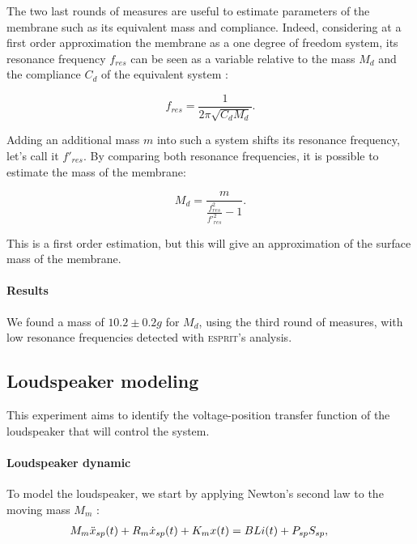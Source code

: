 \documentclass[11pt, twocolumn]{article}
\begin{document}
\vspace{5pt}

The two last rounds of measures are useful to estimate parameters of the membrane such as its equivalent mass and compliance. Indeed, considering at a first order approximation the membrane as a one degree of freedom system, its resonance frequency $f_{res}$ can be seen as a variable relative to the mass $M_d$ and the compliance $C_d$ of the equivalent system :

\begin{equation}
    f_{res} = \frac{1}{2\pi \sqrt{C_d M_d}}.
\end{equation}

Adding an additional mass $m$ into such a system shifts its resonance frequency, let's call it $f'_{res}$. By comparing both resonance frequencies, it is possible to estimate the mass of the membrane:

\begin{equation}
    M_d = \frac{m}{\frac{f_{res}^2}{f'^2_{res}} - 1}.
\end{equation}

This is a first order estimation, but this will give an approximation of the surface mass of the membrane.

\paragraph{Results}

We found a mass of $10.2 \pm 0.2 g$ for $M_d$, using the third round of measures, with low resonance frequencies detected with \textsc{esprit}'s analysis.  



\subsection{Loudspeaker modeling}
\label{loudpart}

This experiment aims to identify the voltage-position transfer function of the loudspeaker that will control the system.


\paragraph{Loudspeaker dynamic}
To model the loudspeaker, we start by applying Newton's second law to the moving mass $M_m$ : 
\vspace{-.1cm}
\begin{align}
    \hspace{-20pt}M_m \Ddot{x}_{sp}(t) + R_m \Dot{x}_{sp}(t) + K_m x(t) = BLi(t) + P_{sp} S_{sp},
    \label{eq_mvt_HP_non_simplifcation}
\end{align}
\end{document}

